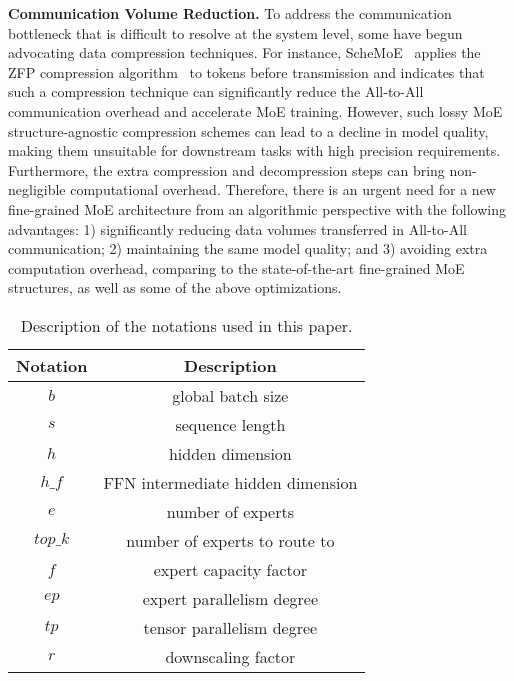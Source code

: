 \noindent\textbf{Communication Volume Reduction.} 
To address the communication bottleneck that is difficult to resolve at the system level, some have begun advocating data compression techniques. 
For instance, ScheMoE~\cite{shi2024schemoe} applies the ZFP compression algorithm~\cite{zfp} to tokens before transmission and indicates that such a compression technique can significantly reduce the All-to-All communication overhead 
and accelerate MoE training. 
However, such lossy MoE structure-agnostic compression schemes can lead to a decline in model quality, making them unsuitable for downstream tasks with high precision requirements. Furthermore, the extra compression and decompression steps can bring non-negligible computational overhead. 
Therefore, there is an urgent need for a new fine-grained MoE architecture from an algorithmic perspective with the following advantages: 1) significantly reducing data volumes transferred in All-to-All communication; 2) maintaining the same model quality; and 3) avoiding extra computation overhead, comparing to the state-of-the-art fine-grained MoE structures, as well as some of the above optimizations.

\begin{table}[!t]
    \centering
    \begin{tabular}{c|c}
    \toprule[0.8pt]
    \textbf{Notation} & \textbf{Description} \\ \midrule[0.8pt]
    $b$        & global batch size \\ \hline 
    $s$        & sequence length \\ \hline 
    $h$        & hidden dimension \\ \hline 
    $h\_f$     & FFN intermediate hidden dimension \\ \hline 
    $e$        & number of experts \\ \hline 
    $top\_k$   & number of experts to route to \\ \hline 
    $f$        & expert capacity factor \\ \hline 
    $ep$       & expert parallelism degree \\ \hline 
    $tp$       & tensor parallelism degree \\ \hline 
    $r$        & downscaling factor \\ \bottomrule[0.8pt]
    \end{tabular}
    \caption{Description of the notations used in this paper.}
    \label{table.notation}
\end{table}